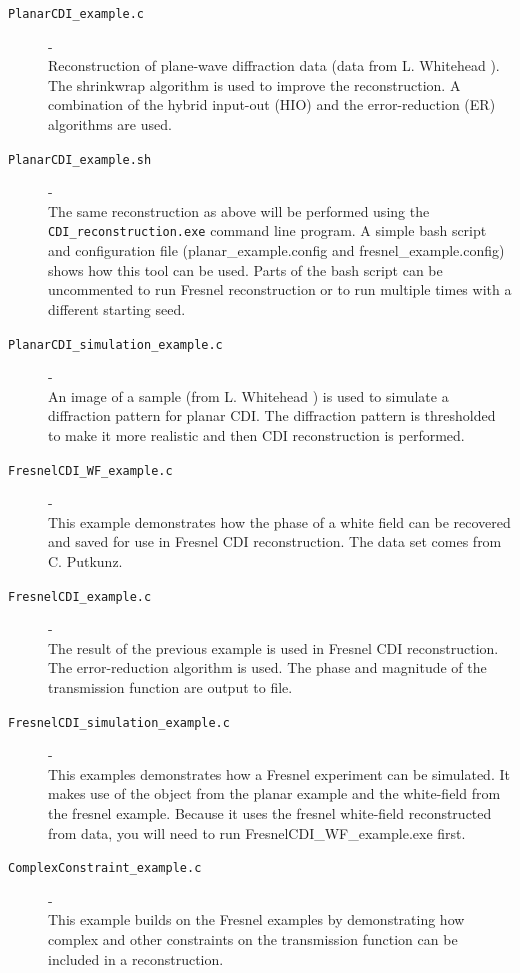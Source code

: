 \documentclass[]{cxs-software}
\begin{document}
\begin{description}

\item[{\tt PlanarCDI\_example.c}] - \\ Reconstruction of plane-wave diffraction
  data (data from L. Whitehead \cite{}). The shrinkwrap algorithm is
  used to improve the reconstruction. A combination of the hybrid
  input-out (HIO) and the error-reduction (ER) algorithms are used.

\item[{\tt PlanarCDI\_example.sh}] - \\ The same reconstruction as
  above will be performed using the {\tt CDI\_reconstruction.exe}
  command line program. A simple bash script and configuration file
  (planar\_example.config and fresnel\_example.config) shows how this
  tool can be used. Parts of the bash script can be uncommented to run
  Fresnel reconstruction or to run multiple times with a different
  starting seed.

\item[{\tt PlanarCDI\_simulation\_example.c}] - \\ An image of a sample (from
  L. Whitehead \cite{}) is used to simulate a diffraction pattern for
  planar CDI. The diffraction pattern is thresholded to make it more
  realistic and then CDI reconstruction is performed.

\item[{\tt FresnelCDI\_WF\_example.c }] - \\ This example demonstrates
  how the phase of a white field can be recovered and saved for use in
  Fresnel CDI reconstruction. The data set comes from C. Putkunz.

\item[{\tt FresnelCDI\_example.c }]- \\ The result of the previous
  example is used in Fresnel CDI reconstruction. The error-reduction
  algorithm is used. The phase and magnitude of the transmission
  function are output to file.

\item[{\tt FresnelCDI\_simulation\_example.c }]- \\ This examples
  demonstrates how a Fresnel experiment can be simulated. It makes use
  of the object from the planar example and the white-field from the
  fresnel example. Because it uses the fresnel white-field
  reconstructed from data, you will need to run
  FresnelCDI\_WF\_example.exe first.

\item[{\tt ComplexConstraint\_example.c }]- \\ This example builds on
  the Fresnel examples by demonstrating how complex and other
  constraints on the transmission function can be included in a
  reconstruction.


\end{description}
\end{document}
